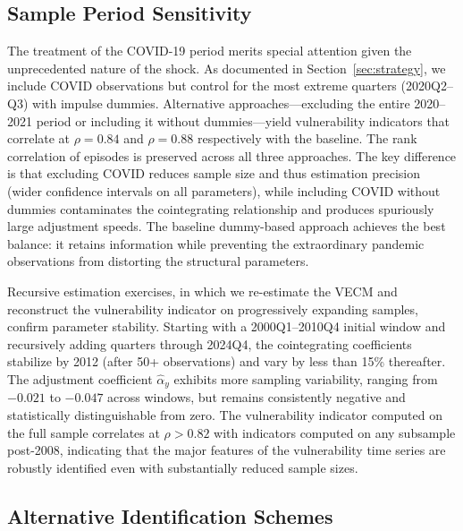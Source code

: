 \documentclass[12pt,a4paper]{article}
\numberwithin{equation}{section}
\theoremstyle{definition}
\theoremstyle{remark}
\begin{document}
\subsection{Sample Period Sensitivity}

The treatment of the COVID-19 period merits special attention given the unprecedented nature of the shock. As documented in Section~\ref{sec:strategy}, we include COVID observations but control for the most extreme quarters (2020Q2--Q3) with impulse dummies. Alternative approaches---excluding the entire 2020--2021 period or including it without dummies---yield vulnerability indicators that correlate at $\rho=0.84$ and $\rho=0.88$ respectively with the baseline. The rank correlation of episodes is preserved across all three approaches. The key difference is that excluding COVID reduces sample size and thus estimation precision (wider confidence intervals on all parameters), while including COVID without dummies contaminates the cointegrating relationship and produces spuriously large adjustment speeds. The baseline dummy-based approach achieves the best balance: it retains information while preventing the extraordinary pandemic observations from distorting the structural parameters.

Recursive estimation exercises, in which we re-estimate the VECM and reconstruct the vulnerability indicator on progressively expanding samples, confirm parameter stability. Starting with a 2000Q1--2010Q4 initial window and recursively adding quarters through 2024Q4, the cointegrating coefficients stabilize by 2012 (after 50+ observations) and vary by less than 15\% thereafter. The adjustment coefficient $\hat{\alpha}_y$ exhibits more sampling variability, ranging from $-0.021$ to $-0.047$ across windows, but remains consistently negative and statistically distinguishable from zero. The vulnerability indicator computed on the full sample correlates at $\rho > 0.82$ with indicators computed on any subsample post-2008, indicating that the major features of the vulnerability time series are robustly identified even with substantially reduced sample sizes.


\subsection{Alternative Identification Schemes}
\end{document}
